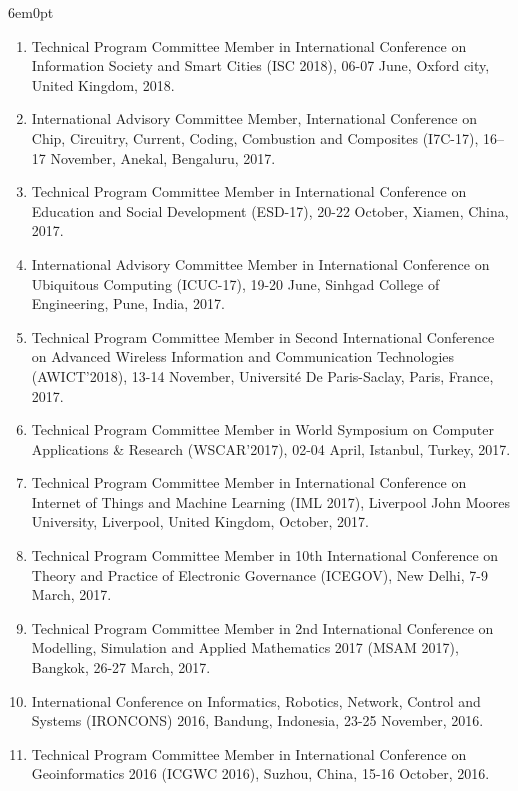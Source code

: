 \documentclass[11pt,a4paper]{moderncv}
\begin{document}
\begin{adjustwidth}{6em}{0pt}
\begin{enumerate}
		\item Technical Program Committee Member in International Conference on Information Society and Smart Cities (ISC 2018), 06-07 June, Oxford city, United Kingdom, 2018.
		
		\item International Advisory Committee Member, International Conference on Chip, Circuitry, Current, Coding, Combustion and Composites (I7C-17), 16–17 November, Anekal, Bengaluru, 2017.
		
		\item Technical Program Committee Member in International Conference on Education and Social Development (ESD-17), 20-22 October, Xiamen, China, 2017.
		
		\item International Advisory Committee Member in International Conference on Ubiquitous Computing (ICUC-17), 19-20 June, Sinhgad College of Engineering, Pune, India, 2017.
		
		\item Technical Program Committee Member in Second International Conference on Advanced Wireless Information and Communication Technologies (AWICT’2018), 13-14 November, Université De Paris-Saclay, Paris, France, 2017.
		
		\item Technical Program Committee Member in World Symposium on Computer Applications \& Research (WSCAR’2017), 02-04 April, Istanbul, Turkey, 2017.
		
		\item Technical Program Committee Member in International Conference on Internet of Things and Machine Learning (IML 2017), Liverpool John Moores University, Liverpool, United Kingdom, October, 2017.
		
		\item Technical Program Committee Member in 10th International Conference on Theory and Practice of Electronic Governance (ICEGOV), New Delhi, 7-9 March, 2017.
		
		\item Technical Program Committee Member in 2nd International Conference on Modelling, Simulation and Applied Mathematics 2017 (MSAM 2017), Bangkok, 26-27 March, 2017.
		
		\item International Conference on Informatics, Robotics, Network, Control and Systems (IRONCONS) 2016, Bandung, Indonesia, 23-25 November, 2016.
		
		\item Technical Program Committee Member in International Conference on Geoinformatics 2016 (ICGWC 2016), Suzhou, China, 15-16 October, 2016.
		

\end{enumerate}
\end{adjustwidth}
\end{document}
